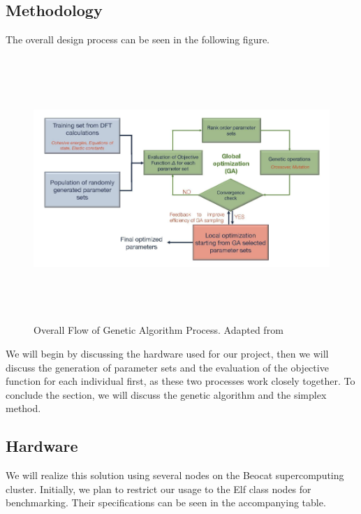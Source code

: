\documentclass[letterpaper, 12pt]{article}
\begin{document}
\begin{flushleft}
\newpage
\section*{Methodology}
 The overall design process can be seen in the following figure.

 \begin{figure}[H]
 	\includegraphics[width=\linewidth,height=10cm,keepaspectratio]{flowchart.png}
 	\caption[Overall Flow of Genetic Algorithm Process]{Overall Flow of Genetic Algorithm Process. Adapted from \cite{Narayanan}}
 	\label{fig:arch}
 \end{figure}

We will begin by discussing the hardware used for our project, then we will discuss the generation of parameter sets and the evaluation of the objective function for each individual first, as these
two processes work closely together. To conclude the section, we will discuss the genetic algorithm and the simplex method. 

\subsection*{Hardware}

We will realize this solution using several nodes on the Beocat supercomputing cluster.  Initially, we plan to restrict our usage to the Elf class nodes for benchmarking. Their specifications can be seen in the accompanying table.
~\newline


\end{flushleft}
\end{document}
